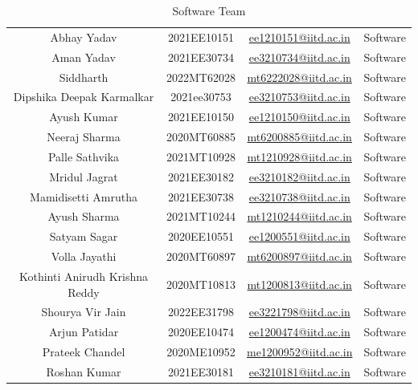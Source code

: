 \documentclass{article}
\begin{document}
\begin{table}[!ht]
\begin{center}
\begin{tabular}{|c|c|c|c|}
Abhay Yadav & 2021EE10151 & \href{mailto:ee1210151@iitd.ac.in}{ee1210151@iitd.ac.in} & Software \\ 
Aman Yadav & 2021EE30734 & \href{mailto:ee3210734@iitd.ac.in}{ee3210734@iitd.ac.in} & Software \\ 
Siddharth & 2022MT62028 & \href{mailto:mt6222028@iitd.ac.in}{mt6222028@iitd.ac.in} & Software \\ 
Dipshika Deepak Karmalkar & 2021ee30753 & \href{mailto:ee3210753@iitd.ac.in}{ee3210753@iitd.ac.in} & Software \\ 
Ayush Kumar & 2021EE10150 & \href{mailto:ee1210150@iitd.ac.in}{ee1210150@iitd.ac.in} & Software \\ 
Neeraj Sharma & 2020MT60885 & \href{mailto:mt6200885@iitd.ac.in}{mt6200885@iitd.ac.in} & Software \\ 
Palle Sathvika & 2021MT10928 & \href{mailto:mt1210928@iitd.ac.in}{mt1210928@iitd.ac.in} & Software \\ 
Mridul Jagrat & 2021EE30182 & \href{mailto:ee3210182@iitd.ac.in}{ee3210182@iitd.ac.in} & Software \\ 
Mamidisetti Amrutha & 2021EE30738 & \href{mailto:ee3210738@iitd.ac.in}{ee3210738@iitd.ac.in} & Software \\ 
Ayush Sharma & 2021MT10244 & \href{mailto:mt1210244@iitd.ac.in}{mt1210244@iitd.ac.in} & Software \\ 
Satyam Sagar & 2020EE10551 & \href{mailto:ee1200551@iitd.ac.in}{ee1200551@iitd.ac.in} & Software \\ 
Volla Jayathi & 2020MT60897 & \href{mailto:mt6200897@iitd.ac.in}{mt6200897@iitd.ac.in} & Software \\ 
Kothinti Anirudh Krishna Reddy & 2020MT10813 & \href{mailto:mt1200813@iitd.ac.in}{mt1200813@iitd.ac.in} & Software \\ 
Shourya Vir Jain & 2022EE31798 & \href{mailto:ee3221798@iitd.ac.in}{ee3221798@iitd.ac.in} &  Software\\ 
Arjun Patidar & 2020EE10474 &\href{mailto:ee1200474@iitd.ac.in}{ee1200474@iitd.ac.in} &  Software\\ 
Prateek Chandel & 2020ME10952 & \href{mailto:me1200952@iitd.ac.in}{me1200952@iitd.ac.in} &  Software\\ 
Roshan Kumar & 2021EE30181 & \href{mailto:}{ee3210181@iitd.ac.in} &  Software\\ 

\hline
\end{tabular}
\caption{Software Team}
\end{center}
\end{table}
\end{document}
